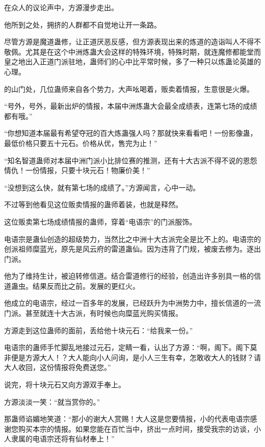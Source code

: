 
\begin{this_body}

在众人的议论声中，方源漫步走出。

他所到之处，拥挤的人群都不自觉地让开一条路。

尽管方源是魔道蛊修，让正道厌恶反感，但方源表现出来的炼道的造诣叫人不得不敬佩。尤其是在这个中洲炼蛊大会这样的特殊环境，特殊时期，就连魔修都能堂而皇之地出入正道门派驻地，蛊师们的心中比平常时候，多了一种只以炼蛊论英雄的心理。

的山门处，几位蛊师来自各个势力，大声吆喝着，贩卖着情报，生意很是火爆。

“号外，号外，最新出炉的情报，本届中洲炼蛊大会最全成绩表，连第七场的成绩都有哦。”

“你想知道本届最有希望夺冠的百大炼蛊强人吗？那就快来看看吧！一份影像蛊，最低价格只要五十元石。价格从优，售完为止！”

“知名智道蛊师对本届中洲门派小比排位赛的推测，还有十大古派不得不说的恩怨情仇！一份情报，只要十块元石！物廉价美！”

“没想到这么快，就有第七场的成绩了。”方源闻言，心中一动。

不过等到他看见这位贩卖情报的蛊师着装，也就是释然。

这位贩卖第七场成绩情报的蛊师，穿着“电语宗”的门派服饰。

电语宗是蛊仙创造的超级势力，当然比之中洲十大古派完全是比不上的。电语宗的创派祖师糜蓝光，原先是风云府的雷道蛊仙。因为违背了门规，被废去修为。逐出门派。

他为了维持生计，被迫转修信道。结合雷道修行的经验，创造出许多别具一格的信道蛊虫。结果反而比之前。发展的更红火。

他成立的电语宗，经过一百多年的发展，已经跃升为中洲势力中，擅长信道的一流门派。甚至就连十大古派，有时候也向糜蓝光购买情报。

方源走到这位蛊师的面前，丢给他十块元石：“给我来一份。”

电语宗的蛊师手忙脚乱地接过元石，定睛一看，认出了方源：“啊，阁下。阁下莫非便是方源大人！？大人能向小人问询，是小人三生有幸，怎敢收大人的钱财？请大人收回，这份情报将免费送您。”

说完，将十块元石又向方源双手奉上。

方源淡淡一笑：“就当赏你的。”

那蛊师谄媚地笑道：“那小的谢大人赏赐！大人这是您要情报，小的代表电语宗感谢您购买本宗的情报。如果您能在百忙当中，挤出一点时间，接受我宗的访谈，小人隶属的电语宗还将有仙材奉上！”


\end{this_body}
